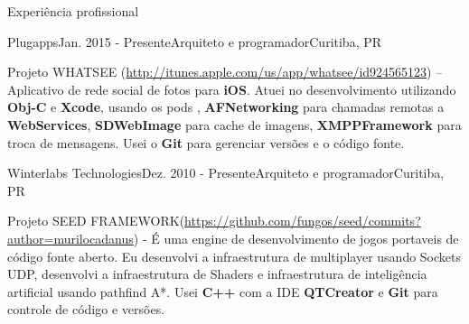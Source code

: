\documentclass{resume}
\begin{document}
  \begin{rSection}{Experiência profissional}
    \begin{rSubsection}{Plugapps}{Jan. 2015 - Presente}{Arquiteto e programador}{Curitiba, PR}
    \item Projeto WHATSEE (\url{http://itunes.apple.com/us/app/whatsee/id924565123}) – Aplicativo de rede social de fotos para \textbf{iOS}. Atuei no desenvolvimento utilizando \textbf{Obj-C} e \textbf{Xcode}, usando os pods , \textbf{AFNetworking} para chamadas remotas a \textbf{WebServices}, \textbf{SDWebImage} para cache de imagens, \textbf{XMPPFramework} para troca de mensagens. Usei o \textbf{Git} para gerenciar versões e o código fonte.\\
    \end{rSubsection}
    \begin{rSubsection}{Winterlabs Technologies}{Dez. 2010 - Presente}{Arquiteto e programador}{Curitiba, PR}
    \item Projeto SEED FRAMEWORK(\url{https://github.com/fungos/seed/commits?author=murilocadanus}) - É uma engine de desenvolvimento de jogos portaveis de código fonte aberto. Eu desenvolvi a infraestrutura de multiplayer usando Sockets UDP, desenvolvi a infraestrutura de Shaders e infraestrutura de inteligência artificial usando pathfind A*. Usei \textbf{C++} com a IDE \textbf{QTCreator} e \textbf{Git} para controle de código e versões. \\

\end{rSubsection}
\end{rSection}
\end{document}
